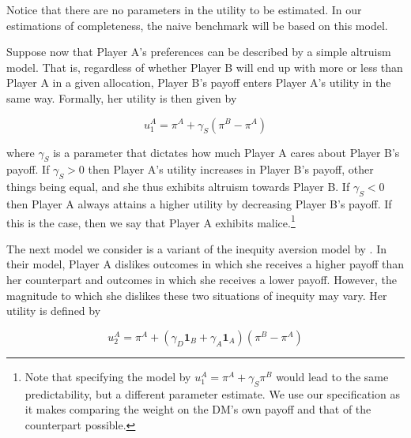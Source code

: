\documentclass[11pt,a4paper]{article}
\theoremstyle{definition}
\begin{document}
Notice that there are no parameters in the utility to be estimated. In our estimations of completeness, the naive benchmark will be based on this model.

Suppose now that Player A's preferences can be described by a simple altruism model. That is, regardless of whether Player B will end up with more or less than Player A in a given allocation, Player B's payoff enters Player A's utility in the same way. Formally, her utility is then given by

\begin{equation}
\label{eq:simple_altruism}
u^{A}_1=\pi^{A}+\gamma_S(\pi^{B}-\pi^A)
\end{equation}

where $\gamma_S$ is a parameter that dictates how much Player A cares about Player B's payoff. If $\gamma_S>0$ then Player A's utility increases in Player B's payoff, other things being equal, and she thus exhibits altruism towards Player B. If $\gamma_S<0$ then Player A always attains a higher utility by decreasing Player B's payoff. If this is the case, then we say that Player A exhibits malice.\footnote{Note that specifying the model by $u^{A}_1=\pi^{A}+\gamma_S \pi^{B}$ would lead to the same predictability, but a different parameter estimate. We use our specification as it makes comparing the weight on the DM's own payoff and that of the counterpart possible.}

The next model we consider is a variant of the inequity aversion model by \citet{Fehr1999}. In their model, Player A dislikes outcomes in which she receives a higher payoff than her counterpart and outcomes in which she receives a lower payoff. However, the magnitude to which she dislikes these two situations of inequity may vary. Her utility is defined by

\begin{equation}
\label{eq:inequity_aversion}
u^{A}_2=\pi^A + (\gamma_D \mathbf{1}_B + \gamma_A \mathbf{1}_A)(\pi^B-\pi^A)
\end{equation}
\end{document}
